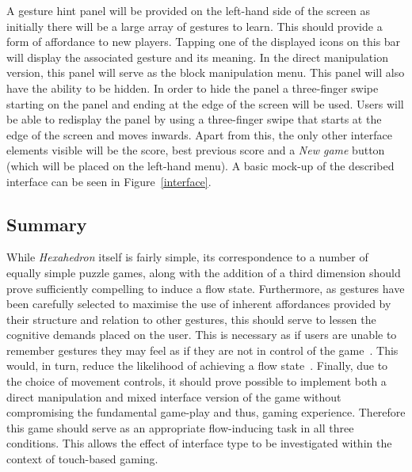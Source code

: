 A gesture hint panel will be provided on the left-hand side of the screen as initially there will be a large array of gestures to learn. This should provide a form of affordance to new players. Tapping one of the displayed icons on this bar will display the associated gesture and its meaning. In the direct manipulation version, this panel will serve as the block manipulation menu. This panel will also have the ability to be hidden. In order to hide the panel a three-finger swipe starting on the panel and ending at the edge of the screen will be used. Users will be able to redisplay the panel by using a three-finger swipe that starts at the edge of the screen and moves inwards. Apart from this, the only other interface elements visible will be the score, best previous score  and a \emph{New game} button (which will be placed on the left-hand menu). A basic mock-up of the described interface can be seen in Figure~\ref{interface}.

\subsection{Summary}
While \emph{Hexahedron} itself is fairly simple, its correspondence to a number of equally simple puzzle games, along with the addition of a third dimension should prove sufficiently compelling to induce a flow state. Furthermore, as gestures have been carefully selected to maximise the use of inherent affordances provided by their structure and relation to other gestures, this should serve to lessen the cognitive demands placed on the user. This is necessary as if users are unable to remember gestures they may feel as if they are not in control of the game~\citep{Wobb09}. This would, in turn, reduce the likelihood of achieving a flow state~\citep{Swee05}. Finally, due to the choice of movement controls, it should prove possible to implement both a direct manipulation and mixed interface version of the game without compromising the fundamental game-play and thus, gaming experience. Therefore this game should serve as an appropriate flow-inducing task in all three conditions. This allows the effect of interface type to be investigated within the context of touch-based gaming.

